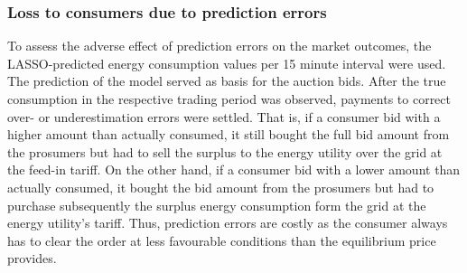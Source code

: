 \subsubsection{Loss to consumers due to prediction errors}

To assess the adverse effect of prediction errors on the market outcomes, the LASSO-predicted energy consumption values per 15 minute interval were used. The prediction of the model served as basis for the auction bids. After the true consumption in the respective trading period was observed, payments to correct over- or underestimation errors were settled. That is, if a consumer bid with a higher amount than actually consumed, it still bought the full bid amount from the prosumers but had to sell the surplus to the energy utility over the grid at the feed-in tariff. On the other hand, if a consumer bid with a lower amount than actually consumed, it bought the bid amount from the prosumers but had to purchase subsequently the surplus energy consumption form the grid at the energy utility's tariff. Thus, prediction errors are costly as the consumer always has to clear the order at less favourable conditions than the equilibrium price provides.

